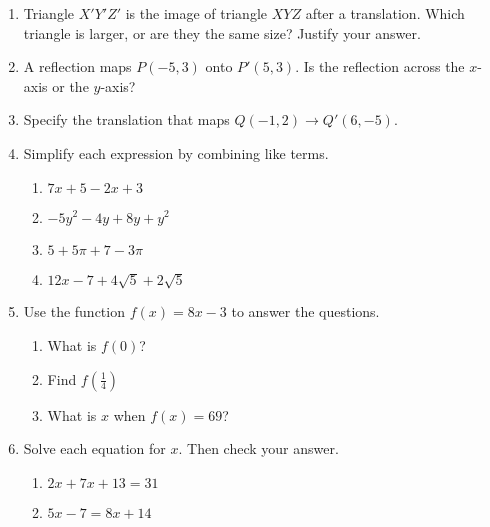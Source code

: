 \documentclass[12pt, twoside]{article}
\begin{document}
\begin{enumerate}[itemsep=0.5cm]
\item Triangle $X'Y'Z'$ is the image of triangle $XYZ$ after a translation. Which triangle is larger, or are they the same size? Justify your answer. \vspace{3cm}

\item A reflection maps $P(-5,3)$ onto $P'(5,3)$. Is the reflection across the $x$-axis or the $y$-axis? \vspace{2cm}

\item Specify the translation that maps $Q(-1,2)\rightarrow Q'(6,-5)$.


\newpage
\item Simplify each expression by combining like terms.
  \begin{multicols}{2}
      \begin{enumerate}[itemsep=1.5cm]
        \item $7x+5-2x+3$
        \item $-5y^2-4y+8y+y^2$
        \item $5+5\pi+7-3\pi$
        \item $12x-7+4\sqrt{5}+2\sqrt{5}$
      \end{enumerate}
  \end{multicols} \vspace{1cm}

\item Use the function $f(x) = 8x-3$ to answer the questions.
  \begin{multicols}{2}
  \begin{enumerate}[itemsep=2cm]
      \item What is $f(0)$?
      \item Find $f(\frac{1}{4})$
      \item What is $x$ when $f(x) = 69$?
  \end{enumerate}
  \end{multicols} \vspace{2cm}

\item Solve each equation for $x$. Then check your answer.
  \begin{multicols}{2}
    \begin{enumerate}[itemsep=1cm]
  \item $2x+7x+13=31$
  \item $5x-7=8x+14$
  \end{enumerate}
  \end{multicols}



\end{enumerate}
\end{document}
